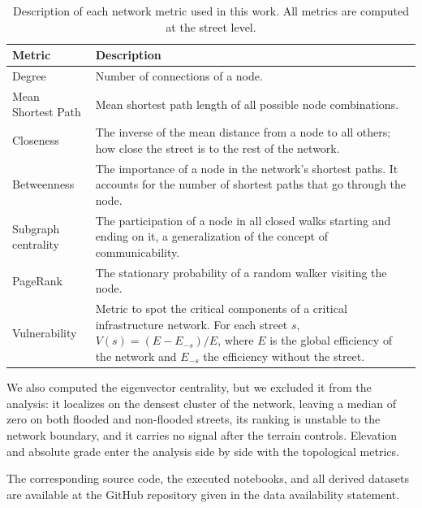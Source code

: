 \documentclass[sn-nature]{sn-jnl}%
\theoremstyle{thmstyleone}%
\theoremstyle{thmstyletwo}%
\theoremstyle{thmstylethree}%
\begin{document}
\begin{table}[H]
    \centering
    \caption{Description of each network metric used in this work. All metrics are computed at the street level.}
    \begin{tabularx}{\textwidth}{X|X}
         \hline
         \textbf{Metric} & \textbf{Description} \\
         \hline
         Degree & Number of connections of a node. \\
         \hline
         Mean Shortest Path & Mean shortest path length of all possible node combinations.\\
         \hline
         Closeness & The inverse of the mean distance from a node to all others; how close the street is to the rest of the network.\\
         \hline
         Betweenness & The importance of a node in the network's shortest paths. It accounts for the number of shortest paths that go through the node.\\
         \hline
         Subgraph centrality \cite{Estrada2008} & The participation of a node in all closed walks starting and ending on it, a generalization of the concept of communicability.\\
         \hline
         PageRank \cite{page1999} & The stationary probability of a random walker visiting the node.\\
         \hline
         Vulnerability \cite{Latora2004, Goldshtein2004} & Metric to spot the critical components of a critical infrastructure network. For each street $s$, $V(s) = (E - E_{-s})/E$, where $E$ is the global efficiency \cite{Latora2001} of the network and $E_{-s}$ the efficiency without the street.
         \\
         \hline
    \end{tabularx}

    \label{tab:metrics}
\end{table}

We also computed the eigenvector centrality, but we excluded it from the analysis: it localizes on the densest cluster of the network, leaving a median of zero on both flooded and non-flooded streets, its ranking is unstable to the network boundary, and it carries no signal after the terrain controls. Elevation and absolute grade enter the analysis side by side with the topological metrics.

The corresponding source code, the executed notebooks, and all derived datasets are available at the GitHub repository given in the data availability statement.
\end{document}
